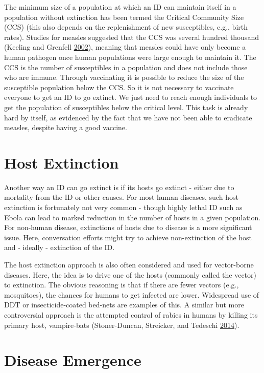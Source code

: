 \documentclass[]{book}
\theoremstyle{definition}
\theoremstyle{definition}
\theoremstyle{definition}
\theoremstyle{remark}
\begin{document}
The minimum size of a population at which an ID can maintain itself in a
population without extinction has been termed the Critical Community
Size (CCS) (this also depends on the replenishment of new susceptibles,
e.g., birth rates). Studies for measles suggested that the CCS was
several hundred thousand (Keeling and Grenfell
\protect\hyperlink{ref-keeling02}{2002}), meaning that measles could
have only become a human pathogen once human populations were large
enough to maintain it. The CCS is the number of susceptibles in a
population and does not include those who are immune. Through
vaccinating it is possible to reduce the size of the susceptible
population below the CCS. So it is not necessary to vaccinate everyone
to get an ID to go extinct. We just need to reach enough individuals to
get the population of susceptibles below the critical level. This task
is already hard by itself, as evidenced by the fact that we have not
been able to eradicate measles, despite having a good vaccine.

\hypertarget{host-extinction}{%
\section{Host Extinction}\label{host-extinction}}

Another way an ID can go extinct is if its hosts go extinct - either due
to mortality from the ID or other causes. For most human diseases, such
host extinction is fortunately not very common - though highly lethal ID
such as Ebola can lead to marked reduction in the number of hosts in a
given population. For non-human disease, extinctions of hosts due to
disease is a more significant issue. Here, conversation efforts might
try to achieve non-extinction of the host and - ideally - extinction of
the ID.

The host extinction approach is also often considered and used for
vector-borne diseases. Here, the idea is to drive one of the hosts
(commonly called the vector) to extinction. The obvious reasoning is
that if there are fewer vectors (e.g., mosquitoes), the chances for
humans to get infected are lower. Widespread use of DDT or
insecticide-coated bed-nets are examples of this. A similar but more
controversial approach is the attempted control of rabies in humans by
killing its primary host, vampire-bats (Stoner-Duncan, Streicker, and
Tedeschi \protect\hyperlink{ref-stoner-duncan14}{2014}).

\hypertarget{disease-emergence}{%
\section{Disease Emergence}\label{disease-emergence}}
\end{document}
